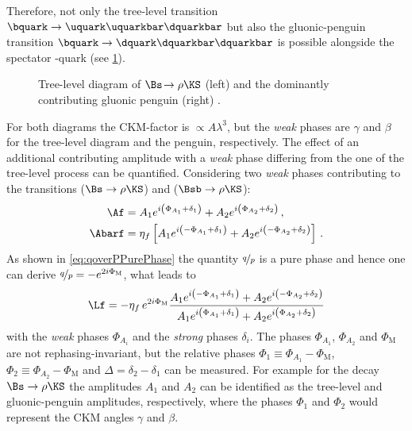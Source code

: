 Therefore, not only the tree-level transition $\bquark\to\uquark\uquarkbar\dquarkbar$ but also the gluonic-penguin transition $\bquark\to\dquark\dquarkbar\dquarkbar$ is possible alongside the spectator \squark-quark (see \cref{fig:Bs2RhoKS}).
\begin{figure}[tbp]
	\centering
	
	
	\caption{Tree-level diagram of $\Bs\!\to\rho\KS$ (left) and the dominantly contributing gluonic penguin (right) \cite{Ellis:2016jkw}.}
	\label{fig:Bs2RhoKS}
\end{figure}
For both diagrams the CKM-factor is $\propto\!A\lambda^3$, but the \emph{weak} phases are $\gamma$ and $\beta$ for the tree-level diagram and the penguin, respectively.
The effect of an additional contributing amplitude with a \emph{weak} phase differing from the one of the tree-level process can be quantified.
Considering two \emph{weak} phases contributing to the transitions \Af ($\Bs\to\rho\KS$) and \Abarf ($\Bsb\to\rho\KS$):
\begin{equation}
\begin{aligned}
\Af&=A_1e^{i\left(\Phi_{A_1}+\delta_1\right)}+A_2e^{i\left(\Phi_{A_2}+\delta_2\right)}\,,\\
\Abarf&=\eta_f\left[A_1e^{i\left(-\Phi_{A_1}+\delta_1\right)}+A_2e^{i\left(-\Phi_{A_2}+\delta_2\right)}\right]\,.
\end{aligned}
\end{equation}
As shown in \cref{eq:qoverPPurePhase} the quantity $\nicefrac{q}{p}$ is a pure phase and hence one can derive $\nicefrac{q}{p}=-e^{2i\Phi_\text{M}}$, what leads to
\begin{equation}
\Lf=-\eta_f\,e^{2i\Phi_\text{M}}\frac{ A_1 e^{i\left(-\Phi_{A_1}+\delta_1\right)} + A_2 e^{i\left(-\Phi_{A_2}+\delta_2\right)}}{A_1e^{i\left(\Phi_{A_1}+\delta_1\right)}+A_2e^{i\left(\Phi_{A_2}+\delta_2\right)}} \label{eq:LfWithPenguin}
\end{equation}
with the \emph{weak} phases $\Phi_{A_i}$ and the \emph{strong} phases $\delta_i$.
The phases $\Phi_{A_1}$, $\Phi_{A_2}$ and $\Phi_\text{M}$ are not rephasing-invariant, but the relative phases \mbox{$\Phi_1\equiv\Phi_{A_1}-\Phi_\text{M}$}, \mbox{$\Phi_2\equiv\Phi_{A_2}-\Phi_\text{M}$} and $\Delta=\delta_2-\delta_1$ can be measured.
For example for the decay \mbox{$\Bs\to\rho\KS$} the amplitudes $A_1$ and $A_2$ can be identified as the tree-level and gluonic-penguin amplitudes, respectively, where the phases $\Phi_1$ and $\Phi_2$ would represent the CKM angles $\gamma$ and $\beta$.
